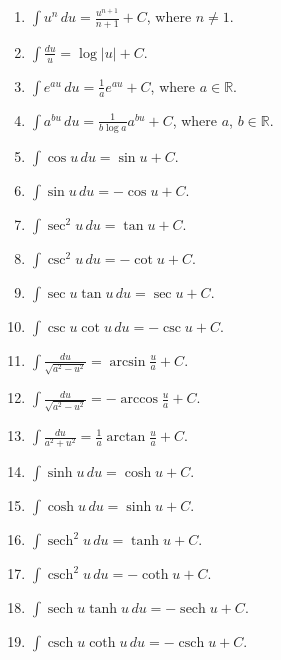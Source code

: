 \documentclass[12pt, letterpaper]{article}
\DeclareMathOperator{\sech}{sech}
\DeclareMathOperator{\csch}{csch}
\begin{document}
\vspace{0.2in}


\begin{enumerate}
\item $\int u^n \, du = \frac{u^{n+1}}{n+1} + C$, where $n \neq 1$.
\item $\int \frac{du}{u} = \log|u| + C$.
\item $\int e^{au} \, du = \frac{1}{a} e^{au} + C$, where $a \in \mathbb{R}$.
\item $\int a^{bu} \, du = \frac{1}{b \log{a}} a^{bu} + C$, where $a$, $b \in \mathbb{R}$.
\item $\int \cos{u} \, du = \sin{u} + C$.
\item $\int \sin{u} \, du = -\cos{u} + C$.
\item $\int \sec^2{u} \, du = \tan{u} + C$.
\item $\int \csc^2{u} \, du = -\cot{u} + C$.
\item $\int \sec{u}\tan{u} \, du = \sec{u} + C$.
\item $\int \csc{u}\cot{u} \, du = -\csc{u} + C$.
\item $\int \frac{du}{\sqrt{a^2 - u^2}} = \arcsin{\frac{u}{a}} + C$.
\item $\int \frac{du}{\sqrt{a^2 - u^2}} = -\arccos{\frac{u}{a}} + C$.
\item $\int \frac{du}{a^2 + u^2} = \frac{1}{a}\arctan{\frac{u}{a}} + C$.

\item $\int \sinh{u} \, du = \cosh{u} + C.$
\item $\int \cosh{u} \, du = \sinh{u} + C.$
\item $\int \sech^2{u} \, du = \tanh{u} + C.$
\item $\int \csch^2{u} \, du = -\coth{u} + C.$
\item $\int \sech{u}\tanh{u} \, du = -\sech{u} + C.$
\item $\int \csch{u}\coth{u} \, du = -\csch{u} + C.$

\end{enumerate}
\end{document}
